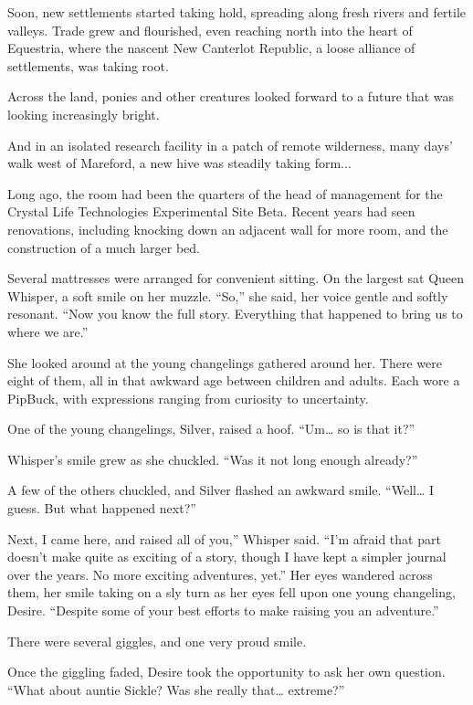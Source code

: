 Soon, new settlements started taking hold, spreading along fresh rivers and fertile valleys. Trade grew and flourished, even reaching north into the heart of Equestria, where the nascent New Canterlot Republic, a loose alliance of settlements, was taking root.

Across the land, ponies and other creatures looked forward to a future that was looking increasingly bright.

And in an isolated research facility in a patch of remote wilderness, many days’ walk west of Mareford, a new hive was steadily taking form...

{\br}%
Long ago, the room had been the quarters of the head of management for the Crystal Life Technologies Experimental Site Beta. Recent years had seen renovations, including knocking down an adjacent wall for more room, and the construction of a much larger bed.

Several mattresses were arranged for convenient sitting. On the largest sat Queen Whisper, a soft smile on her muzzle. “So,” she said, her voice gentle and softly resonant. “Now you know the full story. Everything that happened to bring us to where we are.”

She looked around at the young changelings gathered around her. There were eight of them, all in that awkward age between children and adults. Each wore a PipBuck, with expressions ranging from curiosity to uncertainty.

One of the young changelings, Silver, raised a hoof. “Um… so is that it?”

Whisper’s smile grew as she chuckled. “Was it not long enough already?”

A few of the others chuckled, and Silver flashed an awkward smile. “Well… I guess. But what happened next?”

\leavevmode{}Next, I came here, and raised all of you,” Whisper said. “I’m afraid that part doesn’t make quite as exciting of a story, though I have kept a simpler journal over the years. No more exciting adventures, yet.” Her eyes wandered across them, her smile taking on a sly turn as her eyes fell upon one young changeling, Desire. “Despite some of your best efforts to make raising you an adventure.”

There were several giggles, and one very proud smile.

Once the giggling faded, Desire took the opportunity to ask her own question. “What about auntie Sickle? Was she really that… extreme?”

